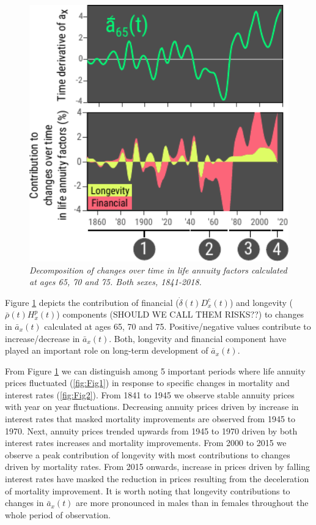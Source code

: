 \documentclass[12pt]{article}
\begin{document}
\begin{figure}[!ht]
	\centering
	\includegraphics[width=1\textwidth]{Fig/Fig4}
	\caption{\textit{Decomposition of changes over time in life annuity factors calculated at ages 65, 70 and 75. Both sexes, 1841-2018.}}
	\label{fig:Fig4}
\end{figure}



Figure \ref{fig:Fig4} depicts the contribution of financial ($\dot{\delta}(t){D}^{c}_x(t)$) and longevity ($\bar{\rho}(t){H}^{p}_x(t)$) components (SHOULD WE CALL THEM RISKS??) to changes in $\bar{a}_x(t)$ calculated at ages 65, 70 and 75. Positive/negative values contribute to increase/decrease in $\bar{a}_x(t)$. Both, longevity and financial component have played an important role on long-term development of $\bar{a}_x(t)$. 

From Figure \ref{fig:Fig4} we can distinguish among 5 important periods where life annuity prices fluctuated (\ref{fig:Fig1}) in response to specific changes in mortality and interest rates (\ref{fig:Fig2}). From 1841 to 1945 we observe stable annuity prices with year on year fluctuations. Decreasing annuity prices driven by increase in interest rates that masked mortality improvements are observed from 1945 to 1970. Next, annuity prices trended upwards from 1945 to 1970 driven by both interest rates increases and mortality improvements. From 2000 to 2015 we observe a peak contribution of longevity with most contributions to changes driven by mortality rates. From 2015 onwards, increase in prices driven by falling interest rates have masked the reduction in prices resulting from the deceleration of mortality improvement. It is worth noting that longevity contributions to changes in $\bar{a}_x(t)$ are more pronounced in males than in females throughout the whole period of observation.
\end{document}
